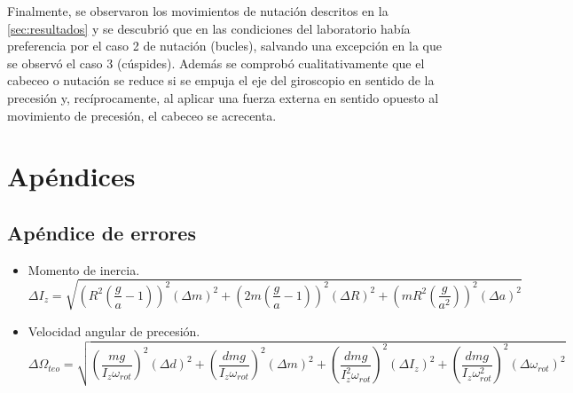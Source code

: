 \documentclass[a4paper]{article}
\begin{document}
Finalmente, se observaron los movimientos de nutación descritos en la  \autoref{sec:resultados} y se descubrió que en las condiciones del laboratorio había preferencia por el caso 2 de nutación (bucles), salvando una excepción en la que se observó el caso 3 (cúspides). Además se comprobó cualitativamente que el cabeceo o nutación se reduce si se empuja el eje del giroscopio en sentido de la precesión y, recíprocamente, al aplicar una fuerza externa en sentido opuesto al movimiento de precesión, el cabeceo se acrecenta.



\section*{Apéndices}
\subsection*{Apéndice de errores}
\begin{itemize}
\item Momento de inercia.
\begin{equation}
\Delta I_z=\sqrt{\left(R^2\left(\frac{g}{a}-1\right)\right)^2\left(\Delta m\right)^2+\left(2m\left(\frac{g}{a}-1\right)\right)^2 \left(\Delta R\right)^2+\left(mR^2\left(\frac{g}{a^2}\right)\right)^2\left(\Delta a\right)^2}
\end{equation}
\item Velocidad angular de precesión.
\begin{equation}
\Delta\Omega_{teo}=\sqrt{\left(\frac{mg}{I_z\omega_{rot}}\right)^2\left(\Delta d\right)^2+\left(\frac{dmg}{I_z\omega_{rot}}\right)^2\left(\Delta m\right)^2+\left(\frac{dmg}{I^2_z\omega_{rot}}\right)^2 \left(\Delta I_z\right)^2+\left(\frac{dmg}{I_z \omega^2_{rot}}\right)^2\left(\Delta \omega_{rot}\right)^2}
\end{equation}

\end{itemize}
\nocite{*}


\end{document}
